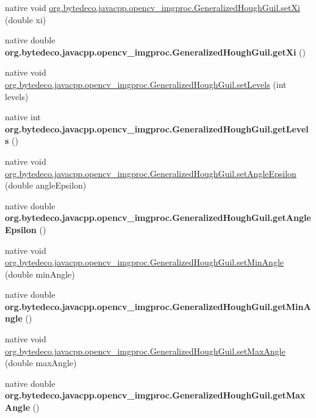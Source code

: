 \begin{DoxyCompactItemize}
\item 
native void \hyperlink{group__imgproc_ga7365e9a7f1eca9a3b2f534a0ac7b78ef}{org.\+bytedeco.\+javacpp.\+opencv\+\_\+imgproc.\+Generalized\+Hough\+Guil.\+set\+Xi} (double xi)
\item 
\mbox{\label{group__imgproc_ga739767da53bf29ade811a768f057175f}} 
native double {\bfseries org.\+bytedeco.\+javacpp.\+opencv\+\_\+imgproc.\+Generalized\+Hough\+Guil.\+get\+Xi} ()
\item 
native void \hyperlink{group__imgproc_ga9eccaeaa69ef94155a2945b8bb409ff4}{org.\+bytedeco.\+javacpp.\+opencv\+\_\+imgproc.\+Generalized\+Hough\+Guil.\+set\+Levels} (int levels)
\item 
\mbox{\label{group__imgproc_ga0c54e00b9a55e7241486315b58cac04d}} 
native int {\bfseries org.\+bytedeco.\+javacpp.\+opencv\+\_\+imgproc.\+Generalized\+Hough\+Guil.\+get\+Levels} ()
\item 
native void \hyperlink{group__imgproc_ga2c1a3aa315145492af4bf215d6180713}{org.\+bytedeco.\+javacpp.\+opencv\+\_\+imgproc.\+Generalized\+Hough\+Guil.\+set\+Angle\+Epsilon} (double angle\+Epsilon)
\item 
\mbox{\label{group__imgproc_ga8da9f73a1509aa11e5c15c17ddf49a04}} 
native double {\bfseries org.\+bytedeco.\+javacpp.\+opencv\+\_\+imgproc.\+Generalized\+Hough\+Guil.\+get\+Angle\+Epsilon} ()
\item 
native void \hyperlink{group__imgproc_ga6d9072493fc3067f7d0cb91678f2d2ad}{org.\+bytedeco.\+javacpp.\+opencv\+\_\+imgproc.\+Generalized\+Hough\+Guil.\+set\+Min\+Angle} (double min\+Angle)
\item 
\mbox{\label{group__imgproc_ga5eb1ad938c0fd856fbba51ee01b60a60}} 
native double {\bfseries org.\+bytedeco.\+javacpp.\+opencv\+\_\+imgproc.\+Generalized\+Hough\+Guil.\+get\+Min\+Angle} ()
\item 
native void \hyperlink{group__imgproc_gafe37f829f70bed0e3ebd23df71dea0f7}{org.\+bytedeco.\+javacpp.\+opencv\+\_\+imgproc.\+Generalized\+Hough\+Guil.\+set\+Max\+Angle} (double max\+Angle)
\item 
\mbox{\label{group__imgproc_gac7dae1113b123361bb613c007b7f950a}} 
native double {\bfseries org.\+bytedeco.\+javacpp.\+opencv\+\_\+imgproc.\+Generalized\+Hough\+Guil.\+get\+Max\+Angle} ()

\end{DoxyCompactItemize}
